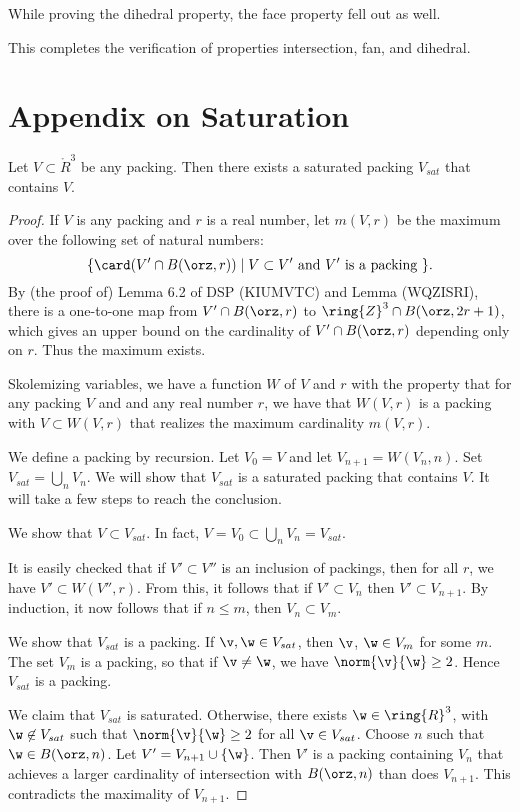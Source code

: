 While proving the dihedral property, the face property fell out as well.

This completes the verification of properties intersection, fan, and dihedral.

\newpage

\section{Appendix on Saturation}

\begin{lemma}  Let $V\subset\ring{R}^3$ be any packing.  
Then there exists a saturated packing $V_{sat}$ that contains $V$.
\end{lemma}

\begin{proof}
If $V$ is any packing and $r$ is a real number, let $m(V,r)$ be the maximum over the following
set of natural numbers:
\[
\{ \card(V'\cap B(\orz,r)) \mid V \subset V' \text{ and } V' \text{ is a packing } \}.
\]
By (the proof of) Lemma 6.2 of DSP  (KIUMVTC) and Lemma (WQZISRI), there is a one-to-one map from
$V'\cap B(\orz,r)$ to $\ring{Z}^3\cap B(\orz,2r+1)$, which gives an upper bound on the cardinality
of $V'\cap B(\orz,r)$ depending only on $r$.  Thus the maximum exists.

Skolemizing variables, we have a function $W$ of $V$ and $r$ with the property that for any
packing $V$ and and any real number $r$, we have that $W(V,r)$ is a packing with $V \subset W(V,r)$ that
realizes the maximum cardinality $m(V,r)$.

We define a packing by recursion.
Let $V_0 = V$ and let $V_{n+1} = W(V_n,n)$.  Set $V_{sat}= \bigcup_n V_n$.  We will show that $V_{sat}$ is
a saturated packing that contains $V$.   It will take a few steps to reach the conclusion.

We show that $V\subset V_{sat}$.  In fact, $V = V_0 \subset \bigcup_n V_n = V_{sat}$.

It is easily checked that if $V' \subset V''$ is an inclusion of packings, then for all $r$, we have $V' \subset W(V'',r)$.
From this, it follows that if $V' \subset V_n$ then $V' \subset V_{n+1}$.
By induction, it now follows that if $n \le m$, then $V_n \subset V_m$.

We show that $V_{sat}$ is a packing.
If $\v,\w\in V_{sat}$, then $\v$, $\w\in V_m$ for some $m$.  The set $V_m$ is a packing, so that
if $\v\ne\w$, we have $\norm{\v}{\w}\ge 2$.  Hence $V_{sat}$ is a packing.


We claim that $V_{sat}$ is saturated.  Otherwise, there exists $\w\in\ring{R}^3$, with $\w\not\in V_{sat}$ such that
$\norm{\v}{\w}\ge 2$ for all $\v\in V_{sat}$.   Choose $n$ such that $\w\in B(\orz,n)$.
Let $V' = V_{n+1} \cup \{\w\}$.  Then $V'$ is a packing containing $V_n$
that achieves a larger cardinality of intersection
with $B(\orz,n)$ than does $V_{n+1}$.  This contradicts the maximality of $V_{n+1}$.
\end{proof}

